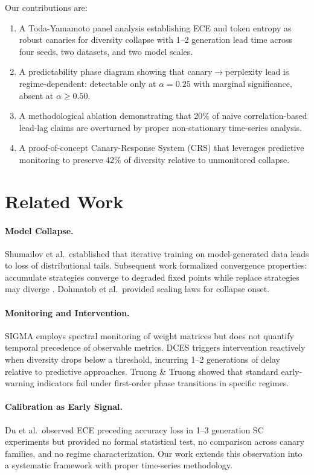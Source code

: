\documentclass[letterpaper]{article}
\begin{document}
Our contributions are:
\begin{enumerate}
    \item A Toda-Yamamoto panel analysis establishing ECE and token entropy as robust canaries for diversity collapse with 1--2 generation lead time across four seeds, two datasets, and two model scales.
    \item A predictability phase diagram showing that canary$\to$perplexity lead is regime-dependent: detectable only at $\alpha=0.25$ with marginal significance, absent at $\alpha \geq 0.50$.
    \item A methodological ablation demonstrating that 20\% of naive correlation-based lead-lag claims are overturned by proper non-stationary time-series analysis.
    \item A proof-of-concept Canary-Response System (CRS) that leverages predictive monitoring to preserve 42\% of diversity relative to unmonitored collapse.
\end{enumerate}

\section{Related Work}

\paragraph{Model Collapse.} Shumailov et al.\ established that iterative training on model-generated data leads to loss of distributional tails. Subsequent work formalized convergence properties: accumulate strategies converge to degraded fixed points while replace strategies may diverge \citep{fu2024iterative}. Dohmatob et al.\ provided scaling laws for collapse onset.

\paragraph{Monitoring and Intervention.} SIGMA employs spectral monitoring of weight matrices but does not quantify temporal precedence of observable metrics. DCES triggers intervention reactively when diversity drops below a threshold, incurring 1--2 generations of delay relative to predictive approaches. Truong \& Truong showed that standard early-warning indicators fail under first-order phase transitions in specific regimes.

\paragraph{Calibration as Early Signal.} Du et al.\ observed ECE preceding accuracy loss in 1--3 generation SC experiments but provided no formal statistical test, no comparison across canary families, and no regime characterization. Our work extends this observation into a systematic framework with proper time-series methodology.
\end{document}
